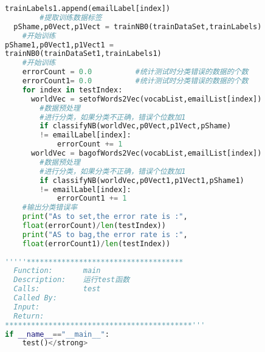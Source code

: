 \begin{lstlisting}[language=python]
        trainLabels1.append(emailLabel[index])  
        #提取训练数据标签  
  pShame,p0Vect,p1Vect = trainNB0(trainDataSet,trainLabels)
    #开始训练  
pShame1,p0Vect1,p1Vect1 = 
trainNB0(trainDataSet1,trainLabels1)
    #开始训练  
    errorCount = 0.0          #统计测试时分类错误的数据的个数  
    errorCount1= 0.0          #统计测试时分类错误的数据的个数  
    for index in testIndex:  
      worldVec = setofWords2Vec(vocabList,emailList[index])
        #数据预处理  
        #进行分类，如果分类不正确，错误个位数加1  
        if classifyNB(worldVec,p0Vect,p1Vect,pShame) 
        != emailLabel[index]:  
            errorCount += 1  
      worldVec = bagofWords2Vec(vocabList,emailList[index])
        #数据预处理  
        #进行分类，如果分类不正确，错误个位数加1  
        if classifyNB(worldVec,p0Vect1,p1Vect1,pShame1) 
        != emailLabel[index]:  
            errorCount1 += 1  
    #输出分类错误率  
    print("As to set,the error rate is :",
    float(errorCount)/len(testIndex))  
    print("AS to bag,the error rate is :",
    float(errorCount1)/len(testIndex))  
      
'''''************************************ 
  Function:       main 
  Description:    运行test函数 
  Calls:          test 
  Called By:        
  Input: 
  Return:           
*******************************************'''  
if __name__=="__main__":  
    test()</strong>  

\end{lstlisting}
